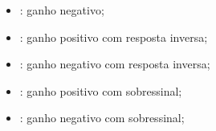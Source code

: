 \begin{frame}
\begin{columns}
\begin{itemize}
      \item \da: ganho negativo;
      \item \da\ua: ganho positivo com resposta inversa;
      \item \ua\da: ganho negativo com resposta inversa;
      \item \ua\ua: ganho positivo com sobressinal;
      \item \da\da: ganho negativo com sobressinal;
    \end{itemize}
  \end{columns}
\end{frame}
